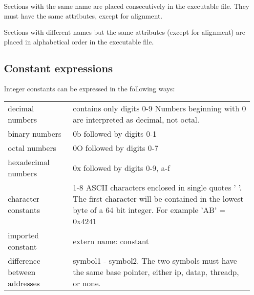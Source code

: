 \documentclass[forwardcom.tex]{subfiles}
\begin{document}
Sections with the same name are placed consecutively in the executable file. They must have the same attributes, except for alignment.
\vspace{2mm}

Sections with different names but the same attributes (except for alignment) are placed in alphabetical order in the executable file.
\vspace{2mm}


\subsection{Constant expressions} \label{assemblyConstantExpressions}
Integer constants can be expressed in the following ways:

\begin{tabular}{|p{47mm}p{115mm}|}
\hline
decimal numbers & contains only digits 0-9 \newline Numbers beginning with 0 are interpreted as decimal, not octal. \\
binary numbers & 0b followed by digits 0-1\\
octal numbers & 0O followed by digits 0-7\\
hexadecimal numbers & 0x followed by digits 0-9, a-f\\
character constants & 1-8 ASCII characters enclosed in single quotes '{ }'. The first character will be contained in the lowest byte of a 64 bit integer. For example 'AB' = 0x4241 \\
imported constant & extern name: constant \\
difference between addresses & symbol1 - symbol2. The two symbols must have the same base pointer, either ip, datap, threadp, or none. \\
\hline
\end{tabular}
\vspace{2mm}
\end{document}
